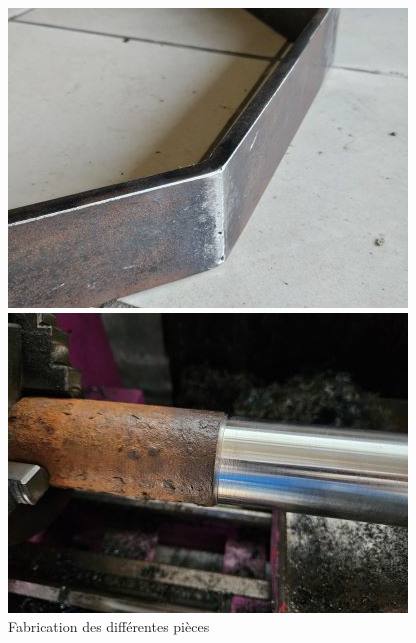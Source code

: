 \documentclass{article}
\begin{document}
\begin{figure}[H]
    \centering
    \begin{minipage}{0.45\textwidth}
    \centering
        \includegraphics[width=\linewidth, angle=0]{Images/photoFabrications/acier_souder.jpg}
    \end{minipage}\hfill
    \begin{minipage}{0.45\textwidth}
        \centering
        \includegraphics[width=\linewidth, angle=0]{Images/photoFabrications/tour.jpg}
        
    \end{minipage}
    \caption{Fabrication des différentes pièces}
    \label{fig:acier_ferailleur-2}
\end{figure}
\end{document}
